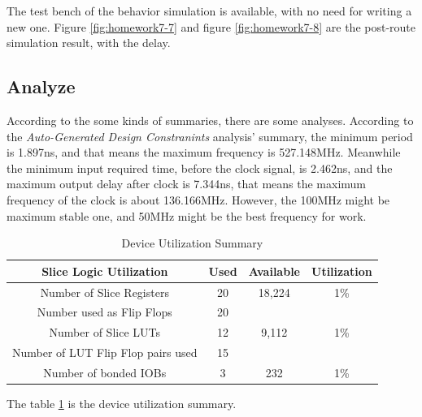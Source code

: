 \documentclass{article}
\begin{document}
    The test bench of the behavior simulation is available, with no need for writing a new one.
    Figure \ref{fig:homework7-7} and figure \ref{fig:homework7-8} are the post-route simulation
    result, with the delay.

    \subsection{Analyze}
    
    According to the some kinds of summaries, there are some analyses.
    According to the \textit{Auto-Generated Design Constranints} analysis' summary,
    the minimum period is 1.897ns, and that means the maximum frequency is 527.148MHz.
    Meanwhile the minimum input required time, before the clock signal, is 2.462ns, and 
    the maximum output delay after clock is 7.344ns, that means the maximum frequency of the clock
    is about 136.166MHz. However, the 100MHz might be maximum stable one, and 50MHz might be the best frequency for work.

    \begin{table}[h!]
        \centering
        \begin{tabular}{|c|c|c|c|}
            \hline Slice Logic Utilization & Used & Available & Utilization\\
            \hline Number of Slice Registers & 20 & 18,224 & 1\% \\ 
            \hline Number used as Flip Flops & 20 &  &  \\ 
            \hline Number of Slice LUTs & 12 & 9,112 & 1\% \\ 
            \hline Number of LUT Flip Flop pairs used & 15 &  &  \\ 
            \hline Number of bonded IOBs & 3 & 232 & 1\% \\ 
            \hline 
        \end{tabular} 
        \caption{Device Utilization Summary}
        \label{tab:c:dus}
    \end{table}
    
    The table \ref{tab:c:dus} is the device utilization summary.
    
\end{document}

